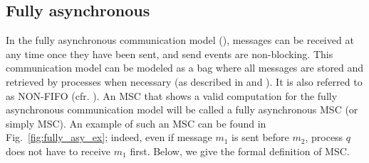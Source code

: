 \subsection{\bf Fully asynchronous}
In the fully asynchronous communication model (\asy), messages can be received at any time once they have been sent, and send events are non-blocking.
This communication model can be modeled as a bag where all messages are stored and retrieved by processes when necessary (as described in \cite{DBLP:journals/fac/ChevrouHQ16} and \cite{DBLP:journals/tcs/BasuB16}).
It is also referred to as NON-FIFO (cfr.  \cite{DBLP:journals/dc/Charron-BostMT96}).
An MSC that shows a valid computation for the fully asynchronous communication model will be called a fully asynchronous MSC (or simply MSC). An example of such an MSC can be found in Fig.~\ref{fig:fully_asy_ex}; indeed, even if message $m_1$ is sent before $m_2$, process $q$ does not have to receive $m_1$ first. Below, we give the formal definition of MSC.


